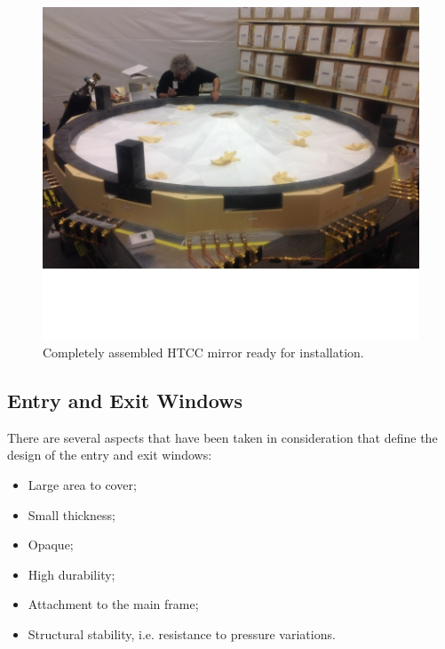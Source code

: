 \begin{figure}[ht]
    \centering
    \includegraphics[width=1.0\linewidth,trim={0 5cm 0 0},clip]{images/Ring_to_Mirror.jpg}
    \caption{Completely assembled HTCC mirror ready for installation.}
    \label{fig:Ring_to_Mirror}
\end{figure}
 
 
 
 
\subsection {Entry and Exit Windows}

\indent There are several aspects that have been taken in consideration that define the design of the entry and exit windows:

\begin{itemize}
    \item Large area to cover;
    \item Small thickness;
    \item Opaque;
    \item High durability;
    \item Attachment to the main frame;
    \item Structural stability, i.e. resistance to pressure variations.
    \end{itemize}

